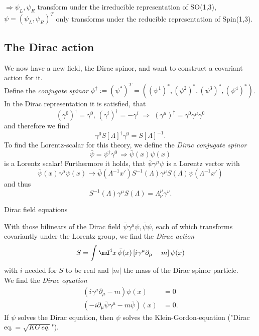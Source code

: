 $\Rightarrow \psi_L, \psi_R$ transform under the irreducible representation of SO(1,3), $\psi=(\psi_L, \psi_R)^T$ only transforms under the reducible representation of Spin(1,3).




\subsection{The Dirac action}

We now have a new field, the Dirac spinor, and want to construct a covariant action for it.\\
Define the \emph{conjugate spinor}
 $\psi^{\dagger} := (\psi^*)^T= \left((\psi^1)^*, (\psi^2)^*, (\psi^3)^*, (\psi^4)^* \right)$. In the Dirac representation it is satisfied, that
 \begin{equation}
 	(\gamma^0)^{\dagger} = \gamma^0, \, (\gamma^i)^{\dagger} = - \gamma^i \; \Rightarrow \; (\gamma^{\mu})^{\dagger} = \gamma^0 \gamma^{\mu} \gamma^0
 \end{equation}
 and therefore we find
 \begin{equation}
 	\gamma^0 S[\Lambda]^{\dagger} \gamma^0 = S[\Lambda]^{-1}.
 \end{equation}
 To find the Lorentz-scalar for this theory, we define the \emph{Dirac conjugate spinor}
 \begin{equation}
 	\bar{\psi} = \psi^{\dagger} \gamma^0 \, \Rightarrow \bar{\psi} (x) \psi(x) 
 \end{equation}
 is a Lorentz scalar! Furthermore it holds, that $\bar{\psi} \gamma^{\mu} \psi$ is a Lorentz vector with 
 \begin{equation}
 	\bar{\psi} (x) \gamma^{\mu} \psi(x) \rightarrow \bar{\psi}(\Lambda^{-1} x') S^{-1}(\Lambda) \gamma^{\mu} S(\Lambda) \psi(\Lambda^{-1} x' )
 \end{equation}
 and thus
 \begin{equation}
 	S^{-1} (\Lambda) \gamma^{\mu} S(\Lambda) = \Lambda^{\mu}_{\nu} \gamma^{\nu}.
 \end{equation}
 \begin{mybox}{Dirac field equations}

With those bilinears of the Dirac field $\bar{\psi} \gamma^{\mu} \psi, \bar{\psi} \psi$, each of which transforms covariantly under the Lorentz group, we find the 
\emph{Dirac action}
\begin{equation}
	S = \int \md^4 x \, \bar{\psi}(x) \left[i \gamma^{\mu} \partial_{\mu} - m\right] \psi(x)
\end{equation}
with $i$ needed for $S$ to be real and $|m|$ the mass of the Dirac spinor particle.\\
We find the \emph{Dirac equation}
\begin{align}
	\left(i \gamma^{\mu} \partial_{\mu} - m\right) \psi(x) &= 0\\
	\left(-i \partial_{\mu} \bar{\psi} \gamma^{\mu} - m \bar{\psi} \right)(x) &= 0.
\end{align}
If $\psi$ solves the Dirac equation, then $\psi$ solves the Klein-Gordon-equation ("Dirac eq. = $\sqrt{KG \, eq.}$").
 \end{mybox}

